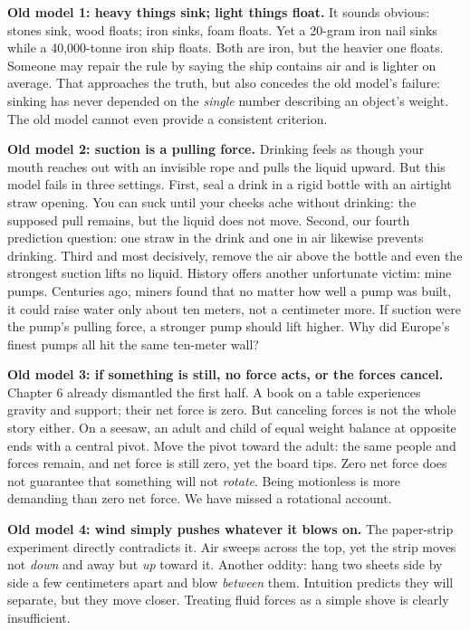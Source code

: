 
\textbf{Old model 1: heavy things sink; light things float.} It sounds obvious: stones sink, wood floats; iron sinks, foam floats. Yet a 20-gram iron nail sinks while a 40,000-tonne iron ship floats. Both are iron, but the heavier one floats. Someone may repair the rule by saying the ship contains air and is lighter on average. That approaches the truth, but also concedes the old model's failure: sinking has never depended on the \emph{single} number describing an object's weight. The old model cannot even provide a consistent criterion.

\textbf{Old model 2: suction is a pulling force.} Drinking feels as though your mouth reaches out with an invisible rope and pulls the liquid upward. But this model fails in three settings. First, seal a drink in a rigid bottle with an airtight straw opening. You can suck until your cheeks ache without drinking: the supposed pull remains, but the liquid does not move. Second, our fourth prediction question: one straw in the drink and one in air likewise prevents drinking. Third and most decisively, remove the air above the bottle and even the strongest suction lifts no liquid. History offers another unfortunate victim: mine pumps. Centuries ago, miners found that no matter how well a pump was built, it could raise water only about ten meters, not a centimeter more. If suction were the pump's pulling force, a stronger pump should lift higher. Why did Europe's finest pumps all hit the same ten-meter wall?

\textbf{Old model 3: if something is still, no force acts, or the forces cancel.} Chapter 6 already dismantled the first half. A book on a table experiences gravity and support; their net force is zero. But canceling forces is not the whole story either. On a seesaw, an adult and child of equal weight balance at opposite ends with a central pivot. Move the pivot toward the adult: the same people and forces remain, and net force is still zero, yet the board tips. Zero net force does not guarantee that something will not \emph{rotate}. Being motionless is more demanding than zero net force. We have missed a rotational account.

\textbf{Old model 4: wind simply pushes whatever it blows on.} The paper-strip experiment directly contradicts it. Air sweeps across the top, yet the strip moves not \emph{down} and away but \emph{up} toward it. Another oddity: hang two sheets side by side a few centimeters apart and blow \emph{between} them. Intuition predicts they will separate, but they move closer. Treating fluid forces as a simple shove is clearly insufficient.

